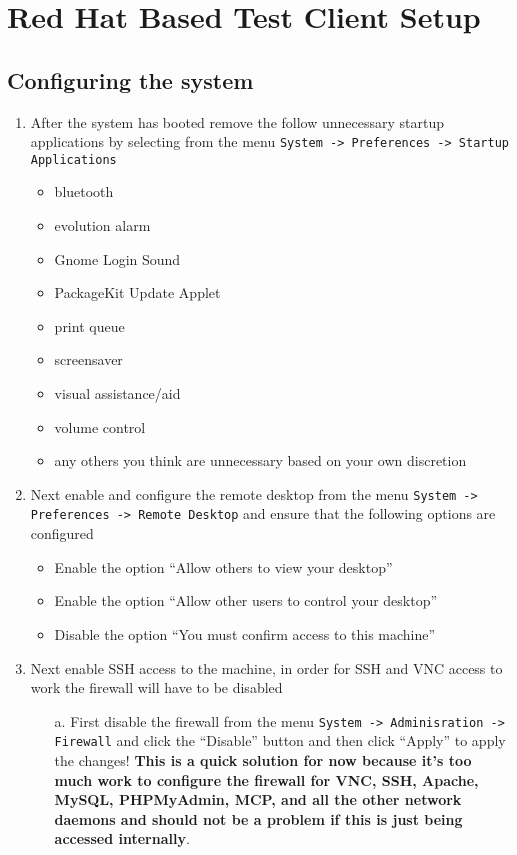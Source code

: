 \section{Red Hat Based Test Client Setup}
\subsection{Configuring the system}
\label{sec:rhconfig}
\begin{enumerate}
\item 	After the system has booted remove the follow unnecessary startup applications by selecting from the menu  
		\verb|System -> Preferences -> Startup Applications|
\begin{itemize}
\item	bluetooth
\item	evolution alarm
\item	Gnome Login Sound
\item	PackageKit Update Applet
\item	print queue
\item	screensaver
\item	visual assistance/aid
\item	volume control
\item	any others you think are unnecessary based on your own discretion
\end{itemize}

\item	Next enable and configure the remote desktop from the menu \verb|System -> Preferences -> Remote Desktop| and ensure
		that the following options are configured	
\begin{itemize}
\item	Enable the option ``Allow others to view your desktop''
\item	Enable the option ``Allow other users to control your desktop''
\item	Disable the option ``You must confirm access to this machine''
\end{itemize}

\item	Next enable SSH access to the machine, in order for SSH and VNC access to work the firewall will have to be disabled
\begin{itemize}
\item[a.]	First disable the firewall from the menu \verb|System -> Adminisration -> Firewall| and click the ``Disable'' 
			button and then click ``Apply'' to apply the changes! {\bf This is a quick solution for now because it's too 
			much work to configure the firewall for VNC, SSH, Apache, MySQL, PHPMyAdmin, MCP, and all the other network 
			daemons and should not be a problem if this is just being accessed internally}.


\end{itemize}
\end{enumerate}
